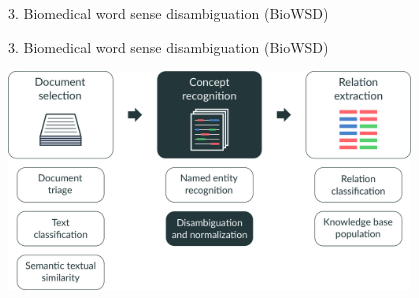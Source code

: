\renewcommand{\CurrentProgressBarIs}{\ThreeOfFive}
\begingroup
\begin{frame}[t,plain]{3. Biomedical word sense disambiguation (BioWSD)}
\end{frame}
\endgroup
\begingroup
{}
\begin{frame}[t]{3. Biomedical word sense disambiguation (BioWSD)}

\centering
\includegraphics[width=0.80\textwidth]{img/biomedical-information-extraction/v3/006.pdf}%

\end{frame}
\endgroup
